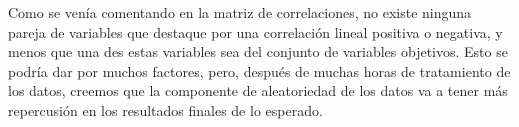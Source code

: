 Como se venía comentando en la matriz de correlaciones, no existe ninguna pareja de variables que destaque por una correlación lineal positiva o negativa, y menos que una des estas variables sea del conjunto de variables objetivos. Esto se podría dar por muchos factores, pero, después de muchas horas de tratamiento de los datos, creemos que la componente de aleatoriedad de los datos va a tener más repercusión en los resultados finales de lo esperado.




\newpage